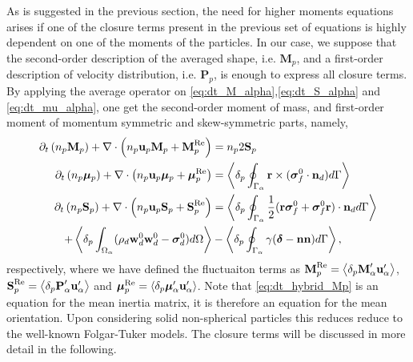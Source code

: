 As is suggested in the previous section, the need for higher moments equations arises if one of the closure terms present in the previous set of equations is highly dependent on one of the moments of the particles. 
In our case, we suppose that the second-order description of the averaged shape, i.e. $\textbf{M}_p$, and a first-order description of velocity distribution, i.e. $\textbf{P}_p$,  is enough to express all closure terms. 
By applying the average operator on \ref{eq:dt_M_alpha},\ref{eq:dt_S_alpha} and \ref{eq:dt_mu_alpha}, one get the second-order moment of mass, and first-order moment of momentum symmetric and skew-symmetric parts, namely, 
\begin{align}
    \pddt \left(n_p \textbf{M}_p\right)
    + \div \left(
        n_p \textbf{u}_p \textbf{M}_p
    + \textbf{M}_p^\text{Re}
    \right)
    &=
    n_p2  \textbf{S}_p
    \label{eq:dt_hybrid_Mp}\\
    \label{eq:dt_hybrid_mup}
    \pddt \left(n_p \bm{\mu}_p\right)
    + \div \left(
    n_p \textbf{u}_p \bm{\mu}_p
    + \bm{\mu}_p^\text{Re}
    \right)
    &=
    \pSavg{\textbf{r}\times(\bm\sigma_f^0\cdot \textbf{n}_d)}
    \\
\label{eq:dt_hybrid_Sp}
\pddt \left(n_p \textbf{S}_p\right)
+ \div \left(
    n_p \textbf{u}_p \textbf{S}_p
+ \textbf{S}_p^\text{Re}
\right)
&=
\pSavg{\frac{1}{2}(\textbf{r}\bm\sigma_f^0+\bm\sigma_f^0\textbf{r})\cdot \textbf{n}_d}\nonumber\\
+ \pOavg{
    (\rho_d \textbf{w}_d^0  \textbf{w}_d^0 
    - \bm{\sigma}_d^0)
}
&-  \pSavg{\gamma (\bm\delta - \textbf{nn})},
\end{align}
respectively, where we have defined the fluctuaiton terms as $
 \textbf{M}_p^\text{Re}
 = \left<\delta_p \textbf{M}_\alpha' \textbf{u}_\alpha'\right> $,  $ 
 \textbf{S}_p^\text{Re}
 = \left<\delta_p \textbf{P}_\alpha' \textbf{u}_\alpha'\right>$ and $ 
 \bm{\mu}_p^\text{Re}
 = \left<\delta_p \bm{\mu}_\alpha' \textbf{u}_\alpha'\right>
$.
Note that \ref{eq:dt_hybrid_Mp}  is an equation for the mean inertia matrix, it is therefore an equation for the mean orientation. 
Upon considering solid non-spherical particles this reduces reduce to the well-known Folgar-Tuker models. 
The closure terms will be discussed in more detail in the following. 


